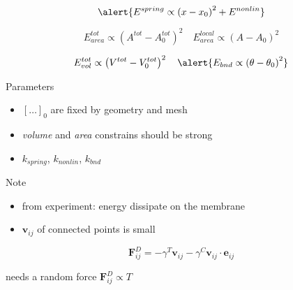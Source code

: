 \bframe{}
\bcc  
  \bc
  \ec
  \bc
  \ec
\ecc  
\eframe

\[
  \alert{E^{spring} \propto \left( x - x_0 \right)^2 + E^{nonlin}}
\]

\[
  E^{tot}_{area} \propto \left( A^{tot} - A_{0}^{tot} \right)^2 \quad
  E^{local}_{area} \propto \left( A - A_{0} \right)^2
\]

\[
         E^{tot}_{vol} \propto \left( V^{tot} - V_{0}^{tot} \right)^2 \quad
  \alert{E_{bnd} \propto \left(\theta - \theta_0 \right)^2}
\]

\begin{exampleblock}{Parameters}
  \begin{itemize}
  \item $[\ldots]_0$ are fixed by geometry and mesh
  \item \textit{volume} and \textit{area} constrains should be strong
  \item $k_{spring}$, $k_{nonlin}$, $k_{bnd}$
  \end{itemize}
\end{exampleblock}
\eframe

\begin{exampleblock}{Note}
  \begin{itemize}
    \item from experiment: energy dissipate on the membrane
    \item $\mathbf{v}_{ij}$ of connected points is small
  \end{itemize}
\end{exampleblock}
  
\[
\mathbf{F}_{ij}^D = - \gamma^T \mathbf{v}_{ij} - \gamma^C \mathbf{v}_{ij} \cdot \mathbf{e}_{ij}
\]

needs a random force $\mathbf{F}_{ij}^D \propto T$
\eframe
